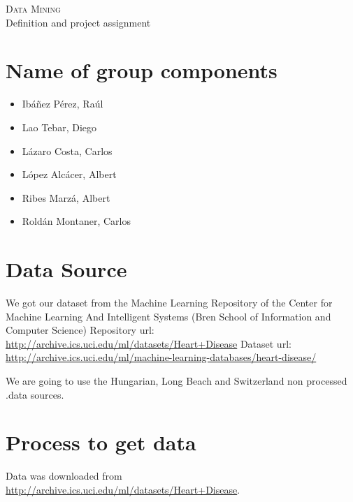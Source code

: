 \documentclass[a4paper,12pt]{article}
\begin{document}
\begin{center}
    \huge{\textsc{Data Mining} \\ Definition and project assignment}
\end{center}


%

\section{Name of group components}

    \begin{itemize}
    
        \item Ibáñez Pérez, Raúl
        \item Lao Tebar, Diego
        \item Lázaro Costa, Carlos
        \item López Alcácer, Albert
        \item Ribes Marzá, Albert
        \item Roldán Montaner, Carlos

    \end{itemize}

\section{Data Source}

    We got our dataset from the Machine Learning Repository of the Center for Machine Learning And Intelligent Systems (Bren School of Information and Computer Science)\newline
    Repository url: \url{http://archive.ics.uci.edu/ml/datasets/Heart+Disease}\newline
    Dataset url: \url{http://archive.ics.uci.edu/ml/machine-learning-databases/heart-disease/} \newline

    We are going to use the Hungarian, Long Beach and Switzerland non processed .data sources.

\section{Process to get data}
    Data was downloaded from \url{http://archive.ics.uci.edu/ml/datasets/Heart+Disease}. 
    
\end{document}
